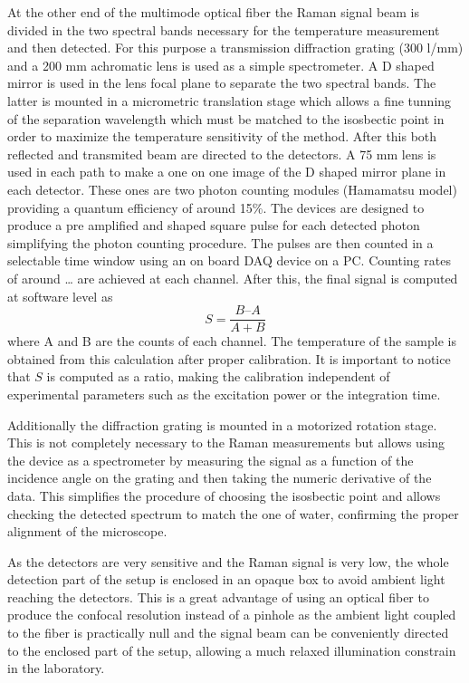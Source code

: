 \documentclass[twocolumn]{svjour3}       %
\begin{document}
At the other end of the multimode optical fiber the Raman signal beam is divided in the two spectral bands necessary for the temperature measurement and then detected. For this purpose a transmission diffraction grating (300 l/mm) and a 200 mm achromatic lens is used as a simple spectrometer. A D shaped mirror is used in the lens focal plane to separate the two spectral bands. The latter is mounted in a micrometric translation stage which allows a fine tunning of the separation wavelength which must be matched to the isosbectic point in order to maximize the temperature sensitivity of the method. After this both reflected and transmited beam are directed to the detectors. A 75 mm lens is used in each path to make a one on one image of the D shaped mirror plane in each detector. These ones are two photon counting modules (Hamamatsu model) providing a quantum efficiency of around 15\%. The devices are designed to produce a pre amplified and shaped square pulse for each detected photon simplifying the photon counting procedure. The pulses are then counted in a selectable time window using an on board DAQ device on a PC. Counting rates of around … are achieved at each channel. After this, the final signal is computed at software level as
\begin{equation}\label{eq:senal}
S = \frac{B – A}{A + B}
\end{equation}
where A and B are the counts of each channel. The temperature of the sample is obtained from this calculation after proper calibration.  It is important to notice that $S$ is computed as a ratio, making the calibration independent of experimental parameters such as the excitation power or the integration time.

Additionally the diffraction grating is mounted in a motorized rotation stage.  This is not completely necessary to the Raman measurements but allows using the device as a spectrometer by measuring the signal as a function of the incidence angle on the grating and then taking the numeric derivative of the data. This simplifies the procedure of choosing the isosbectic point and allows checking the detected spectrum to match the one of water, confirming the proper alignment of the microscope. 

As the detectors are very sensitive and the Raman signal is very low, the whole detection part of the setup is enclosed in an opaque box to avoid ambient light reaching the detectors. This is a great advantage of using an optical fiber to produce the confocal resolution instead of a pinhole as the ambient light coupled to the fiber is practically null and the signal beam can be conveniently directed to the enclosed part of the setup, allowing a much relaxed illumination constrain in the laboratory. 
\end{document}
